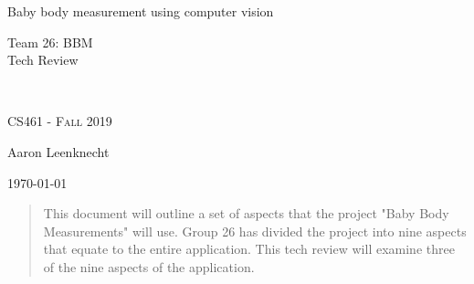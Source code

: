 \documentclass[letterpaper,10pt,draftclsnofoot,onecolumn,compsoc]{IEEEtran}
\def\name{Aaron Leenknecht}
\begin{document}
\begin{titlepage}
\centering
\vspace*{6cm}
{\scshape\LARGE \begin{singlespace}Baby body measurement using computer vision\\ \end{singlespace} Team 26: BBM \\ Tech Review } \\
	{\scshape\Large CS461 - Fall 2019 \par}
	\vspace{.5cm}
	\name \par
    {\large \today \par} 
	\vspace*{1cm}
	
\begin{abstract}
\begin{singlespace}
This document will outline a set of aspects that the project "Baby Body Measurements" will use. Group 26 has divided the project into nine aspects that equate to the entire application. This tech review will examine three of the nine aspects of the application.
\end{singlespace}
\end{abstract}

\end{titlepage}

\newpage

\tableofcontents

\thispagestyle{empty}

\newpage

\end{document}
